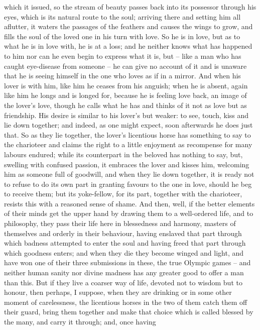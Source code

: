  which it issued, so the stream of beauty passes back into its
possessor through his
eyes, which is its natural route to the soul; arriving there and setting
him all aflutter, it waters the  passages of the feathers and
causes the wings to grow, and fills the soul of the loved one in his
turn with love. So he is in love, but as to what he is in love with, he
is at a loss; and he neither knows what has happened to him nor can he
even begin to express what it is, but -- like a man who has caught
eye-disease  from someone -- he can give no account of it and is
unaware that he is seeing himself in the one who loves as if in a
mirror. And when his lover is with him, like him he ceases from his
anguish; when he is absent, again like him he longs and is longed for,
because he is feeling love back, an image of the  lover's love,
though he calls what he has and thinks of it not as love but as
friendship. His desire
is similar to his lover's but weaker: to see, touch, kiss and lie down
together; and indeed, as one might expect, soon afterwards he does just
that. So as  they lie together, the lover's licentious horse has
something to say to the charioteer and claims the right to a little
enjoyment  as recompense for many labours endured; while its
counterpart in the beloved has nothing to say, but, swelling with
confused passion, it embraces the lover and kisses him, welcoming him as
someone full of goodwill, and when they lie down together, it is ready
not to refuse to do its own part in granting favours  to the one
in love, should he beg to receive them; but its yoke-fellow, for its
part, together with the charioteer, resists this with a reasoned sense
of shame. And then, well, if the better elements of their minds get the
upper hand by drawing them to a well-ordered life, and to philosophy,
they pass their life here in  blessedness and harmony, masters
of themselves and orderly in their behaviour, having enslaved that part
through which badness attempted to enter the soul and having freed that
part through which goodness enters; and when they die they become winged
and light, and have won one of their three 
submissions in these,
the true Olympic games -- and neither human sanity nor divine madness
has any greater good to offer  a man than this. But if they live
a coarser way of life, devoted not to wisdom but to honour, then
perhaps, I suppose, when they are drinking or in some other moment of
carelessness, the licentious horses in the two of them catch them off
their guard, bring them together and make that choice which is called
 blessed by the many, and carry it through; and, once having
